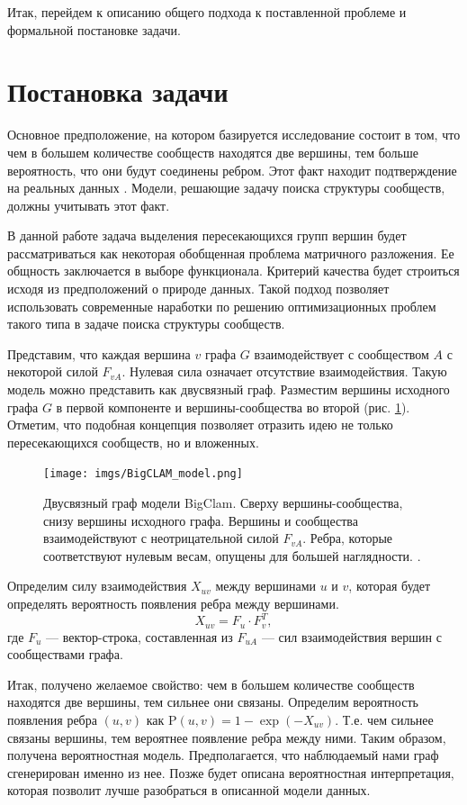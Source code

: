 \documentclass{ITaSconf}
\def\PP{\mathrm{P}}
\begin{document}
	Итак, перейдем к описанию общего подхода к поставленной проблеме и формальной постановке задачи.
	
	\section{Постановка задачи}
	
	Основное предположение, на котором базируется исследование состоит в том, что чем в большем количестве сообществ находятся две вершины, тем больше вероятность, что они будут соединены ребром. Этот факт находит подтверждение на реальных данных \cite{yang2013overlapping}. Модели, решающие задачу поиска структуры сообществ, должны учитывать этот факт.
	
	В данной работе задача выделения пересекающихся групп вершин будет рассматриваться как некоторая обобщенная проблема матричного разложения. Ее общность заключается в выборе функционала. Критерий качества будет строиться исходя из предположений о природе данных. Такой подход позволяет использовать современные наработки по решению оптимизационных проблем такого типа в задаче поиска структуры сообществ.
	
	Представим, что каждая вершина $v$ графа $G$ взаимодействует с сообществом $A$ с некоторой силой $F_{vA}$. Нулевая сила означает отсутствие взаимодействия. Такую модель можно представить как двусвязный граф. Разместим вершины исходного графа $G$ в первой компоненте и вершины-сообщества во второй (рис. \ref{fig:AGM}). Отметим, что подобная концепция позволяет отразить идею не только пересекающихся сообществ, но и вложенных.
	\begin{figure}[!ht]
		\centering
		\texttt{[image: imgs/BigCLAM\_model.png]}
		\caption{Двусвязный граф модели BigClam. Сверху вершины-сообщества, снизу вершины исходного графа. Вершины и сообщества взаимодействуют с неотрицательной силой $F_{vA}$. Ребра, которые соответствуют нулевым весам, опущены для большей наглядности. \cite{yang2013overlapping}.}
		\label{fig:AGM}
	\end{figure}
	Определим силу взаимодействия $X_{uv}$ между вершинами $u$ и $v$, которая будет определять вероятность появления ребра между вершинами.
	$$X_{uv} = F_{u} \cdot F_{v}^T,$$
	где $F_{u}$ --- вектор-строка, составленная из $F_{uA}$ --- сил взаимодействия вершин с сообществами графа.
	
	Итак, получено желаемое свойство: чем в большем количестве сообществ находятся две вершины, тем сильнее они связаны. 
	Определим вероятность появления ребра $(u,v)$ как $\PP(u, v) = 1 - \exp ( - X_{uv})$. 
	Т.е. чем сильнее связаны вершины, тем вероятнее появление ребра между ними. 
	Таким образом, получена вероятностная модель. Предполагается, что наблюдаемый нами граф сгенерирован именно из нее.
	Позже будет описана вероятностная интерпретация, которая позволит лучше разобраться в описанной модели данных.
	
\end{document}
